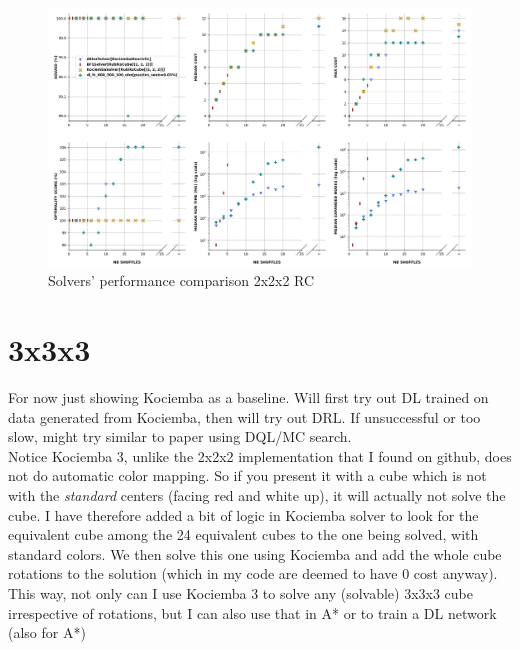 \begin{landscape}
\centering\vspace*{\fill}
\begin{figure}[H]
\centering
\includegraphics[scale=0.60]{./Figures/222RCPerformance}
\caption[222RCPerformance]{Solvers' performance comparison 2x2x2 RC}
\label{fig:222RCPerformance}
\end{figure}
\vfill
\end{landscape}
\restoregeometry



\section{3x3x3}

For now just showing Kociemba as a baseline. Will first try out DL trained on data generated from Kociemba, then will try out DRL. If unsuccessful or too slow, might try similar to paper using DQL/MC search.
\\
Notice Kociemba 3, unlike the 2x2x2 implementation that I found on github, does not do automatic color mapping. So if you present it with a cube which is not with the \textit{standard} centers (facing red and white up), it will actually not solve the cube. I have therefore added a bit of logic in Kociemba solver to look for the equivalent cube among the 24 equivalent cubes to the one being solved, with standard colors. We then solve this one using Kociemba and add the whole cube rotations to the solution (which in my code are deemed to have 0 cost anyway). This way, not only can I use Kociemba 3 to solve any (solvable) 3x3x3 cube irrespective of rotations, but I can also use that in A* or to train a DL network (also for A*)



